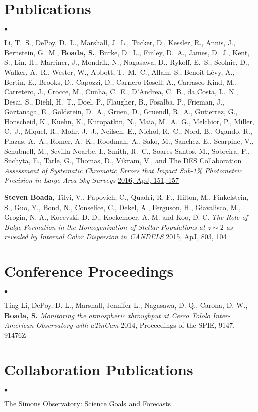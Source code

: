 \documentclass[margin,line, 11pt]{res}
\newenvironment{list2}{
  \begin{list}{$\bullet$}{%
      \setlength{\itemsep}{0in}
      \setlength{\parsep}{0in} \setlength{\parskip}{0in}
      \setlength{\topsep}{0in} \setlength{\partopsep}{0in}
      \setlength{\leftmargin}{0.2in}}}{\end{list}}
\begin{document}
\begin{resume}
\section{Publications}
\begin{list2}
\item Li, T.~S., DePoy, D.~L., Marshall, J.~L., Tucker, D., Kessler, R., Annis, J.,
Bernstein, G.~M., \textbf{Boada, S.}, Burke, D.~L., Finley, D.~A., James, D.~J., Kent, S.,
Lin, H., Marriner, J., Mondrik, N., Nagasawa, D., Rykoff, E.~S., Scolnic, D., Walker, A.~R.,
Wester, W., Abbott, T.~M.~C., Allam, S., Benoit-L\'evy, A., Bertin, E., Brooks, D., Capozzi,
D., Carnero Rosell, A., Carrasco Kind, M., Carretero, J., Crocce, M., Cunha, C.~E.,
D'Andrea, C.~B., da Costa, L.~N., Desai, S., Diehl, H.~T., Doel, P., Flaugher, B., Fosalba,
P., Frieman, J., Gaztanaga, E., Goldstein, D.~A., Gruen, D., Gruendl, R.~A., Gutierrez, G.,
Honscheid, K., Kuehn, K., Kuropatkin, N., Maia, M.~A.~G., Melchior, P., Miller, C.~J.,
Miquel, R., Mohr, J.~J., Neilsen, E., Nichol, R.~C., Nord, B., Ogando, R., Plazas, A.~A.,
Romer, A.~K., Roodman, A., Sako, M., Sanchez, E., Scarpine, V., Schubnell, M.,
Sevilla-Noarbe, I., Smith, R.~C., Soares-Santos, M., Sobreira, F., Suchyta, E., Tarle, G.,
Thomas, D., Vikram, V., and The DES Collaboration \emph{Assessment of Systematic Chromatic
Errors that Impact Sub-1\% Photometric Precision in Large-Area Sky Surveys} \href{http://adsabs.harvard.edu/abs/2016AJ....151..157L}{2016, ApJ, 151, 157}

\item \textbf{Steven Boada}, Tilvi, V., Papovich, C., Quadri, R. F., Hilton, M., Finkelstein, S., Guo, Y., Bond, N., Conselice, C., Dekel, A., Ferguson, H., Giavalisco, M., Grogin, N. A., Kocevski, D. D., Koekemoer, A. M. and Koo, D. C. \emph{The Role of Bulge Formation in the Homogenization of Stellar Populations at $z\sim2$ as revealed by Internal Color Dispersion in CANDELS} \href{http://adsabs.harvard.edu/abs/2015ApJ...803..104B}{2015, ApJ, 803, 104}
\end{list2}

\section{Conference Proceedings}
\begin{list2}
\item Ting Li, DePoy, D. L., Marshall, Jennifer L., Nagasawa, D. Q., Carona, D. W., {\bf Boada, S.} \emph{Monitoring the atmospheric throughput at Cerro Tololo Inter-American Observatory with aTmCam} 2014, Proceedings of the SPIE, 9147, 91476Z
\end{list2}

\section{Collaboration Publications}
\begin{list2}
  \item The Simons Observatory: Science Goals and Forecasts
\end{list2}

\end{resume}
\end{document}
